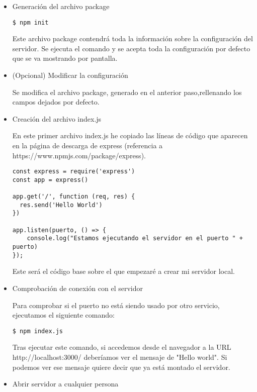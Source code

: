\begin{itemize}
    \item Generación del archivo package
    
\begin{lstlisting}
$ npm init 
\end{lstlisting}

Este archivo package contendrá toda la información sobre la configuración del servidor. Se ejecuta el comando y se acepta toda la configuración por defecto que se va mostrando por pantalla.
    
    \item (Opcional) Modificar la configuración
    
Se modifica el archivo package, generado en el anterior paso,rellenando los campos dejados por defecto.

    \item Creación del archivo index.js
    
En este primer archivo index.js he copiado las líneas de código que aparecen en la página de descarga de express (referencia a https://www.npmjs.com/package/express).

\begin{lstlisting}
const express = require('express')
const app = express()

app.get('/', function (req, res) {
  res.send('Hello World')
})

app.listen(puerto, () => {
    console.log("Estamos ejecutando el servidor en el puerto " + puerto)
});
\end{lstlisting}

Este será el código base sobre el que empezaré a crear mi servidor local.

    \item Comprobación de conexión con el servidor
    
Para comprobar si el puerto no está siendo usado por otro servicio, ejecutamos el siguiente comando:

\begin{lstlisting}
$ npm index.js 
\end{lstlisting}

Tras ejecutar este comando, si accedemos desde el navegador a la URL http://localhost:3000/ deberíamos ver el mensaje de "Hello world". Si podemos ver ese mensaje quiere decir que ya está montado el servidor.

    \item Abrir servidor a cualquier persona
    

\end{itemize}
